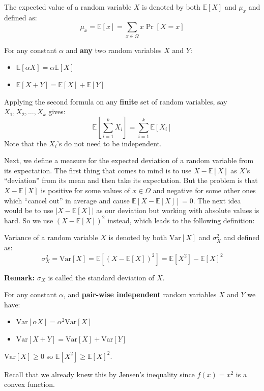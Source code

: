 \documentclass[11pt]{article}
\newcommand{\Ex}{\mathbb{E}}
\newcommand{\Var}{\text{Var}}
\begin{document}
\begin{definition} The expected value of a random variable $X$ is denoted by both $\Ex[X]$ and $\mu_x$ and defined as:
\begin{equation*}
   \mu_x = \Ex[x] = \sum\limits_{x \in \Omega} x\Pr[X = x] 
\end{equation*}
\end{definition}
\begin{fact}\label{fact:exp}
For any constant $\alpha$ and \textbf{any} two random variables $X$ and $Y$:
\begin{itemize}
    \item $\Ex[\alpha X] = \alpha \Ex[X]$
    \item $\Ex[X + Y] = \Ex[X] + \Ex[Y]$
\end{itemize}
Applying the second formula on any \textbf{finite} set of random variables, say $X_1, X_2,\dots,X_k$ gives:
\begin{equation*}
    \Ex[\sum\limits_{i=1}^k X_i] = \sum\limits_{i=1}^k \Ex[X_i]
\end{equation*}
Note that the $X_i$'s do not need to be independent.
\end{fact}
Next, we define a measure for the expected deviation of a random variable from its expectation. The first thing that comes to mind is to use $X - \Ex[X]$ as $X$'s ``deviation'' from its mean and then take its expectation. But the problem is that $X - \Ex[X]$ is positive for some values of $x \in \Omega$ and negative for some other ones which ``cancel out'' in average and cause $\Ex[X - \Ex[X]] = 0$. The next idea would be to use $|X - \Ex[X]|$ as our deviation but working with absolute values is hard. So we use $(X - \Ex[X])^2$ instead, which leads to the following definition:
\begin{definition}
Variance of a random variable $X$ is denoted by both $\Var[X]$ and $\sigma^2_X$ and defined as:
\begin{equation*}
    \sigma^2_X = \Var[X] = \Ex[(X - \Ex[X])^2] = \Ex[X^2] - \Ex[X]^2
\end{equation*}
\end{definition}
\noindent \textbf{Remark:} $\sigma_X$ is called the standard deviation of $X$.
\begin{fact} \label{fact:var}For any constant $\alpha$, and \textbf{pair-wise independent} random variables $X$ and $Y$ we have:
\begin{itemize}
    \item $\Var[\alpha X] = \alpha^2\Var[X]$
    \item $\Var[X + Y] = \Var[X] + \Var[Y]$
\end{itemize}
\end{fact}
\begin{fact}
$\Var[X] \geq0$ so  $\Ex[X^2] \geq \Ex[X]^2$. 
\end{fact}
Recall that we already knew this by Jensen's inequality since $f(x) = x^2$ is a convex function.
\end{document}
